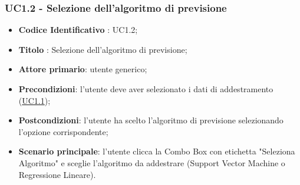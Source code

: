 		\subsubsection{UC1.2 - Selezione dell'algoritmo di previsione}
		\begin{itemize}
			\item\textbf{Codice Identificativo} : UC1.2;
			\item\textbf{Titolo} : Selezione dell'algoritmo di previsione;
			\item\textbf{Attore primario}: utente generico;
			\item\textbf{Precondizioni}: l'utente deve aver selezionato i dati di addestramento (\hyperref[par:UC1.1]{UC1.1});
			\item\textbf{Postcondizioni}: l'utente ha scelto l'algoritmo di previsione selezionando l'opzione corrispondente;
			\item\textbf{Scenario principale}: l'utente clicca la Combo Box con etichetta "Seleziona Algoritmo" e sceglie l'algoritmo da addestrare (Support Vector Machine o Regressione Lineare).
		\end{itemize}
	
	\label{par:UC1.3}
